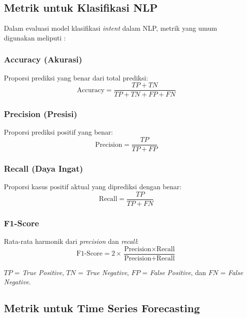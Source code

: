 \subsection{Metrik untuk Klasifikasi NLP}

Dalam evaluasi model klasifikasi \textit{intent} dalam NLP, metrik yang umum digunakan meliputi \parencite{ali2020chatbot,perdana2025multi}:

\subsubsection{Accuracy (Akurasi)}
Proporsi prediksi yang benar dari total prediksi:
\begin{equation}
\text{Accuracy} = \frac{TP + TN}{TP + TN + FP + FN}
\end{equation}

\subsubsection{Precision (Presisi)}
Proporsi prediksi positif yang benar:
\begin{equation}
\text{Precision} = \frac{TP}{TP + FP}
\end{equation}

\subsubsection{Recall (Daya Ingat)}
Proporsi kasus positif aktual yang diprediksi dengan benar:
\begin{equation}
\text{Recall} = \frac{TP}{TP + FN}
\end{equation}

\subsubsection{F1-Score}
Rata-rata harmonik dari \textit{precision} dan \textit{recall}:
\begin{equation}
\text{F1-Score} = 2 \times \frac{\text{Precision} \times \text{Recall}}{\text{Precision} + \text{Recall}}
\end{equation}

$TP$ = \textit{True Positive}, $TN$ = \textit{True Negative}, $FP$ = \textit{False Positive}, dan $FN$ = \textit{False Negative}.

\subsection{Metrik untuk Time Series Forecasting}

